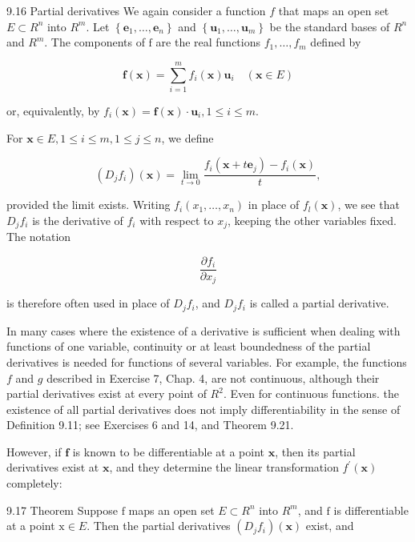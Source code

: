 \documentclass[10pt]{article}
\begin{document}
9.16 Partial derivatives We again consider a function $f$ that maps an open set $E \subset R^{n}$ into $R^{m}$. Let $\left\{\mathbf{e}_{1}, \ldots, \mathbf{e}_{n}\right\}$ and $\left\{\mathbf{u}_{1}, \ldots, \mathbf{u}_{m}\right\}$ be the standard bases of $R^{n}$ and $R^{m}$. The components of $\mathrm{f}$ are the real functions $f_{1}, \ldots, f_{m}$ defined by

$$
\mathbf{f}(\mathbf{x})=\sum_{i=1}^{m} f_{i}(\mathbf{x}) \mathbf{u}_{i} \quad(\mathbf{x} \in E)
$$

or, equivalently, by $f_{i}(\mathbf{x})=\mathbf{f}(\mathbf{x}) \cdot \mathbf{u}_{i}, 1 \leq i \leq m$.

For $\mathbf{x} \in E, 1 \leq i \leq m, 1 \leq j \leq n$, we define

$$
\left(D_{j} f_{i}\right)(\mathbf{x})=\lim _{t \rightarrow 0} \frac{f_{i}\left(\mathbf{x}+t \mathbf{e}_{j}\right)-f_{i}(\mathbf{x})}{t},
$$

provided the limit exists. Writing $f_{i}\left(x_{1}, \ldots, x_{n}\right)$ in place of $f_{l}(\mathbf{x})$, we see that $D_{j} f_{i}$ is the derivative of $f_{i}$ with respect to $x_{j}$, keeping the other variables fixed. The notation

$$
\frac{\partial f_{i}}{\partial x_{j}}
$$

is therefore often used in place of $D_{j} f_{i}$, and $D_{j} f_{i}$ is called a partial derivative.

In many cases where the existence of a derivative is sufficient when dealing with functions of one variable, continuity or at least boundedness of the partial derivatives is needed for functions of several variables. For example, the functions $f$ and $g$ described in Exercise 7, Chap. 4, are not continuous, although their partial derivatives exist at every point of $R^{2}$. Even for continuous functions. the existence of all partial derivatives does not imply differentiability in the sense of Definition 9.11; see Exercises 6 and 14, and Theorem 9.21.

However, if $\mathbf{f}$ is known to be differentiable at a point $\mathbf{x}$, then its partial derivatives exist at $\mathbf{x}$, and they determine the linear transformation $f^{\prime}(\mathbf{x})$ completely:

9.17 Theorem Suppose $\mathrm{f}$ maps an open set $E \subset R^{n}$ into $R^{m}$, and $\mathrm{f}$ is differentiable at a point $\mathrm{x} \in E$. Then the partial derivatives $\left(D_{j} f_{i}\right)(\mathbf{x})$ exist, and
\end{document}
